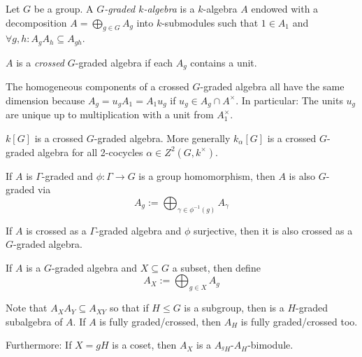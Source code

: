 
\begin{definition}
Let $G$ be a group. A \emph{$G$-graded $k$-algebra} is a $k$-algebra $A$ endowed with a decomposition $A=\bigoplus_{g\in G} A_g$ into $k$-submodules such that $1\in A_1$ and $\forall g,h: A_g A_h\subseteq A_{gh}$.

\medbreak
$A$ is a \emph{crossed} $G$-graded algebra if each $A_g$ contains a unit.
\end{definition}

\begin{remark}
The homogeneous components of a crossed $G$-graded algebra all have the same dimension because $A_g = u_g A_1 = A_1 u_g$ if $u_g\in A_g\cap A^\times$. In particular: The units $u_g$ are unique up to multiplication with a unit from $A_1^\times$.
\end{remark}

\begin{example}
$k[G]$ is a crossed $G$-graded algebra. More generally $k_\alpha[G]$ is a crossed $G$-graded algebra for all 2-cocycles $\alpha\in Z^2(G,k^\times)$.
\end{example}

\begin{example}
If $A$ is $\Gamma$-graded and $\phi:\Gamma\to G$ is a group homomorphism, then $A$ is also $G$-graded via
\[A_g := \bigoplus_{\gamma\in\phi^{-1}(g)} A_\gamma\]

If $A$ is crossed as a $\Gamma$-graded algebra and $\phi$ surjective, then it is also crossed as a $G$-graded algebra.
\end{example}

\begin{example}[Subgroups]
If $A$ is a $G$-graded algebra and $X\subseteq G$ a subset, then define
\[A_X := \bigoplus_{g\in X} A_g\]

Note that $A_X A_Y \subseteq A_{XY}$ so that if $H\leq G$ is a subgroup, then is a $H$-graded subalgebra of $A$. If $A$ is fully graded/crossed, then $A_H$ is fully graded/crossed too.

Furthermore: If $X=gH$ is a coset, then $A_X$ is a $A_{^g H}$-$A_H$-bimodule.
\end{example}


